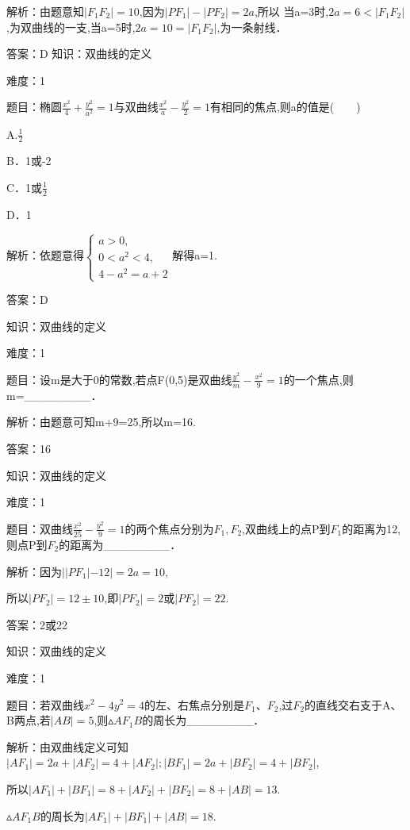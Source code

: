 \documentclass{article} %
\begin{document}
解析：由题意知$|F_1F_2|=10$,因为$|PF_1|-|PF_2|=2a$,所以 当a=3时,$2a=6<|F_1F_2|$,为双曲线的一支,当a=5时,$2a=10=|F_1F_2|$,为一条射线．

答案：D
知识：双曲线的定义

难度：1

题目：椭圆$\frac{x^2}{4}+\frac{y^2}{a^2}=1$与双曲线$\frac{x^2}{a}-\frac{y^2}{2}=1$有相同的焦点,则a的值是(　　)

A.$\frac{1}{2}$  

B．1或-2

C．1或$\frac{1}{2}$

D．1

解析：依题意得$\left\{
\begin{array}{l}
a > 0, \\
0 < a^2 < 4, \\
4-a^2=a+2
\end{array}
\right.$解得a=1.

答案：D



知识：双曲线的定义

难度：1

题目：设m是大于0的常数,若点F(0,5)是双曲线$\frac{y^2}{m}-\frac{x^2}{9}=1$的一个焦点,则m=\_\_\_\_\_\_\_\_．

解析：由题意可知m+9=25,所以m=16.

答案：16



知识：双曲线的定义

难度：1

题目：双曲线$\frac{x^2}{25}-\frac{y^2}{9}=1$的两个焦点分别为$F_{1},F_{2}$,双曲线上的点P到$F_{1}$的距离为12,则点P到$F_{2}$的距离为\_\_\_\_\_\_\_\_．

解析：因为$||PF_1|-12|=2a=10$,

所以$|PF_2|=12\pm 10$,即$|PF_2|=2$或$|PF_2|=22$.

答案：2或22



知识：双曲线的定义

难度：1

题目：若双曲线$x^{2}-4y^{2}=4$的左、右焦点分别是$F_{1}、F_{2}$,过$F_{2}$的直线交右支于A、B两点,若$|AB|=5$,则${\vartriangle}AF_{1}B$的周长为\_\_\_\_\_\_\_\_．

解析：由双曲线定义可知$|AF_1|=2a+|AF_2|=4+|AF_2|;|BF_1|=2a+|BF_2|=4+|BF_2|$,

所以$|AF_1|+|BF_1|=8+|AF_2|+|BF_2|=8+|AB|=13$.

${\vartriangle}AF_{1}B$的周长为$|AF_1|+|BF_1|+|AB|=18$.
\end{document}
